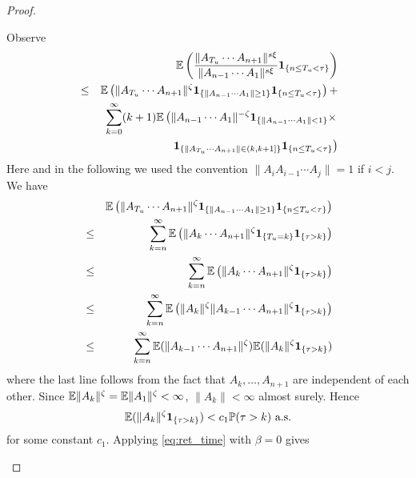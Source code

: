 \documentclass{article}
\theoremstyle{remark}
\begin{document}
\begin{proof}
\begin{enumerate}
      Observe
      \begin{eqnarray*}
        &&
          \mathbb{E}
        \left(
          {
            \|A_{T_u} \cdots A_{n+1} \|^{s\xi}
            \over
            \|A_{n-1} \cdots A_1\|^{s\xi}
         }
         \mathbf{1}_{\{n \leq T_u < \tau\}}
          \right) \\
          &\leq&
          \mathbb{E} \left(
            \|A_{T_u} \cdots A_{n+1}\|^\zeta 
            \mathbf{1}_{\{\|A_{n-1} \cdots A_1\| \geq 1\}}
            \mathbf{1}_{\{n \leq T_u < \tau\}}
          \right) +\\
          &&
          \sum_{k=0}^\infty
          (k+1)
          \mathbb{E} \left(
            \|A_{n-1} \cdots A_1\|^{-\zeta}
            \mathbf{1}_{\{\|A_{n-1} \cdots A_1\| < 1\}} \times \right.\\
          &&
            \left.
            \mathbf{1}_{\{\|A_{T_u} \cdots A_{n+1}\| \in (k, k+1]\}}
            \mathbf{1}_{\{n \leq T_u < \tau\}}
          \right)
      \end{eqnarray*}
      Here and in the following we used the convention
      $\|A_i A_{i-1}\cdots A_j\| = 1$ if $i < j$. We have
      \begin{eqnarray*}
        && \mathbb{E} \left(
          \|A_{T_u} \cdots A_{n+1}\|^\zeta 
          \mathbf{1}_{\{\|A_{n-1} \cdots A_1\| \geq 1\}}
          \mathbf{1}_{\{n \leq T_u < \tau\}}
        \right) \\
        &\leq&
        \sum_{k=n}^\infty
        \mathbb{E} \left(
          \|A_k \cdots A_{n+1}\|^\zeta \mathbf{1}_{\{T_u = k\}} \mathbf{1}_{\{\tau > k\}}
        \right)  \\
        &\leq& 
        \sum_{k=n}^\infty
        \mathbb{E} \left(
          \|A_k \cdots A_{n+1}\|^\zeta \mathbf{1}_{\{\tau > k\}}
        \right) \\
        &\leq&
        \sum_{k=n}^\infty
        \mathbb{E} \left(
        \|A_k\|^\zeta \|A_{k-1} \cdots A_{n+1}\|^\zeta \mathbf{1}_{\{\tau > k\}}
        \right) \\
        &\leq&
        \sum_{k=n}^\infty
        \mathbb{E} (\|A_{k-1} \cdots A_{n+1}\|^\zeta)
        \mathbb{E} (\|A_k\|^\zeta \mathbf{1}_{\{\tau > k\}})
      \end{eqnarray*}
      where the last line follows from the fact that
      $A_{k}, \dots, A_{n+1}$ are independent of each other. Since
      $\mathbb{E} \|A_k\|^\zeta = \mathbb{E} \|A_1\|^\zeta < \infty$, $\|A_k\| <
      \infty$ almost surely. Hence
      \begin{equation*}
        \mathbb{E} (\|A_k\|^\zeta \mathbf{1}_{\{\tau > k\}}) < c_1 \mathbb{P}(\tau > k) \text{ a.s.}
      \end{equation*}
      for some constant $c_1$. Applying \eqref{eq:ret_time} with
      $\beta = 0$ gives

\end{enumerate}
\end{proof}
\end{document}
